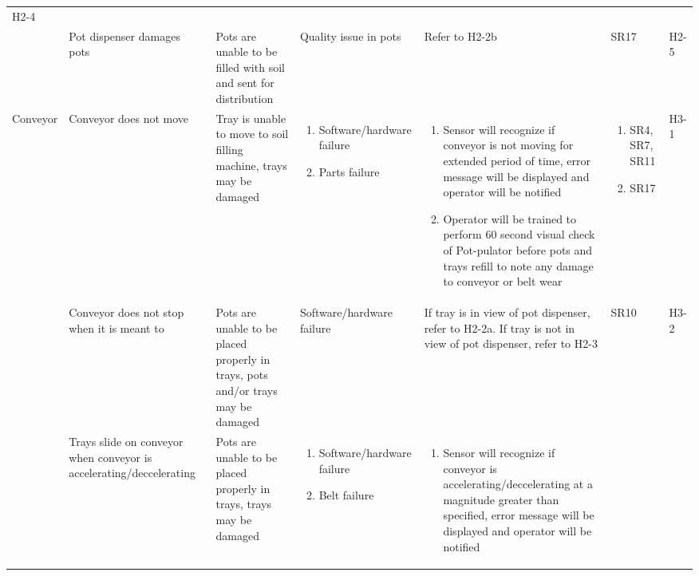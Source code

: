 \documentclass{article}
\begin{document}
\begin{landscape}
\begin{center}
\begin{longtable}{|l|  p{3cm}  p{4cm}  p{3cm}  p{4cm}  p{2cm}  p{1cm}|}
        H2-4\\

        &
        Pot dispenser damages pots&
        Pots are unable to be filled with soil and sent for distribution&
        Quality issue in pots&
        Refer to H2-2b&
        SR17&
        H2-5\\
        \hline
        Conveyor&
        Conveyor does not move&
        Tray is unable to move to soil filling machine, trays may be damaged&
        \begin{enumerate}[label=(\alph*)]
            \item Software/hardware failure
            \item Parts failure
        \end{enumerate}&
        \begin{enumerate}[label=(\alph*)]
            \item Sensor will recognize if conveyor is not moving for extended period of time, error message will be displayed and operator will be notified
            \item Operator will be trained to perform 60 second visual check of Pot-pulator before pots and trays refill to note any damage to conveyor or belt wear
        \end{enumerate}&
        \begin{enumerate}[label=(\alph*)]
            \item SR4, SR7, SR11
            \item SR17
        \end{enumerate}&
        H3-1\\
        &
        Conveyor does not stop when it is meant to&
        Pots are unable to be placed properly in trays, pots and/or trays may be damaged&
        Software/hardware failure&
        If tray is in view of pot dispenser, refer to H2-2a. If tray is not in view of pot dispenser, refer to H2-3&
        SR10&
        H3-2\\
        &
        Trays slide on conveyor when conveyor is accelerating/deccelerating&
        Pots are unable to be placed properly in trays, trays may be damaged&
        \begin{enumerate}[label=(\alph*)]
            \item Software/hardware failure
            \item Belt failure
        \end{enumerate}&
        \begin{enumerate}[label=(\alph*)]
            \item Sensor will recognize if conveyor is accelerating/deccelerating at a magnitude greater than specified, error message will be displayed and operator will be notified

\end{enumerate}
\end{longtable}
\end{center}
\end{landscape}
\end{document}
